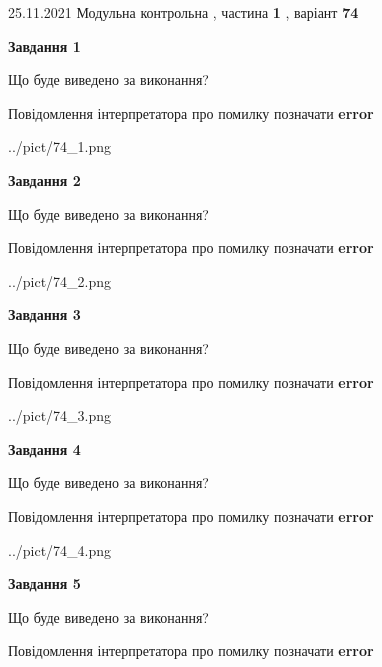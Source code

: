 \documentclass[10pt, ukrainian]{article}
\begin{document}
{25.11.2021 Модульна контрольна , частина \textbf { 1 }, варіант  \No \textbf { 74 }\par}
{
\begin {large}

{\begin {center}\textbf{Завдання 1}\end {center}}\par
Що буде виведено за виконання? \par
Повідомлення інтерпретатора про помилку позначати \textbf{error}

\begin{center}
	{../pict/74_1.png}
\end{center}
\newpage

{\begin {center}\textbf{Завдання 2}\end {center}}\par
Що буде виведено за виконання? \par
Повідомлення інтерпретатора про помилку позначати \textbf{error}

\begin{center}
	{../pict/74_2.png}
\end{center}
\newpage

{\begin {center}\textbf{Завдання 3}\end {center}}\par
Що буде виведено за виконання? \par
Повідомлення інтерпретатора про помилку позначати \textbf{error}

\begin{center}
	{../pict/74_3.png}
\end{center}
\newpage

{\begin {center}\textbf{Завдання 4}\end {center}}\par
Що буде виведено за виконання? \par
Повідомлення інтерпретатора про помилку позначати \textbf{error}

\begin{center}
	{../pict/74_4.png}
\end{center}
\newpage

{\begin {center}\textbf{Завдання 5}\end {center}}\par
Що буде виведено за виконання? \par
Повідомлення інтерпретатора про помилку позначати \textbf{error}


\end{large}}
\end{document}
